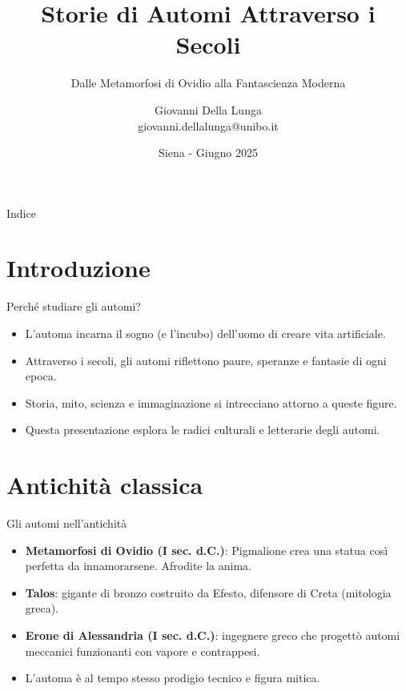 \documentclass{beamer}
\title{Storie di Automi Attraverso i Secoli}
\subtitle{Dalle Metamorfosi di Ovidio alla Fantascienza Moderna}
\author{Giovanni Della Lunga\\{\footnotesize giovanni.dellalunga@unibo.it}}
\institute{A lezione di Intelligenza Artificiale}
\date{Siena - Giugno 2025}
\begin{document}
\begin{frame}
    \titlepage
\end{frame}

\begin{frame}{Indice}
    \tableofcontents
\end{frame}
%
%
\AtBeginSubsection{\frame{\subsectionpage}}
%
\section{Introduzione}
%
%
\begin{frame}{Perché studiare gli automi?}
  \begin{itemize}
    \item L'automa incarna il sogno (e l'incubo) dell'uomo di creare vita artificiale.
    \item Attraverso i secoli, gli automi riflettono paure, speranze e fantasie di ogni epoca.
    \item Storia, mito, scienza e immaginazione si intrecciano attorno a queste figure.
    \item Questa presentazione esplora le radici culturali e letterarie degli automi.
  \end{itemize}
\end{frame}
%
\section{Antichità classica}
%
%
\begin{frame}{Gli automi nell'antichità}
  \begin{itemize}
    \item \textbf{Metamorfosi di Ovidio (I sec. d.C.)}: Pigmalione crea una statua così perfetta da innamorarsene. Afrodite la anima.
    \item \textbf{Talos}: gigante di bronzo costruito da Efesto, difensore di Creta (mitologia greca).
    \item \textbf{Erone di Alessandria (I sec. d.C.)}: ingegnere greco che progettò automi meccanici funzionanti con vapore e contrappesi.
    \item L'automa è al tempo stesso prodigio tecnico e figura mitica.
  \end{itemize}
\end{frame}
%
\end{document}
